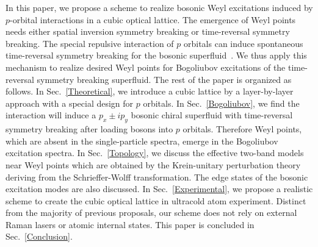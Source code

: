 \documentclass[aps,pra,floatfix,twocolumn,superscriptaddress]{revtex4-1}
\begin{document}
In this paper, we propose a scheme to realize bosonic Weyl excitations induced by $p$-orbital interactions in a cubic optical lattice. The emergence of Weyl points needs either spatial inversion symmetry breaking or time-reversal symmetry breaking. The special repulsive interaction of $p$ orbitals can induce spontaneous time-reversal symmetry breaking for the bosonic superfluid~\cite{PhysRevA.74.013607}. We thus apply this mechanism to realize desired Weyl points for Bogoliubov excitations of the time-reversal symmetry breaking superfluid. The rest of the paper is organized as follows. In Sec.~\ref{Theoretical}, we introduce a cubic lattice by a layer-by-layer approach with a special design for $p$ orbitals. In Sec.~\ref{Bogoliubov}, we find the interaction will induce a $p_x\pm ip_y$ bosonic chiral superfluid with time-reversal symmetry breaking after loading bosons into $p$ orbitals. Therefore Weyl points, which are absent in the single-particle spectra, emerge in the Bogoliubov excitation spectra. In Sec.~\ref{Topology}, we discuss the effective two-band models near Weyl points which are obtained by the Krein-unitary perturbation theory deriving from the Schrieffer-Wolff transformation. The edge states of the bosonic excitation modes are also discussed. In Sec.~\ref{Experimental}, we propose a realistic scheme to create the cubic optical lattice in ultracold atom experiment. Distinct from the majority of previous proposals, our scheme does not rely on external Raman lasers or atomic internal states. This paper is concluded in Sec.~\ref{Conclusion}.
\end{document}
